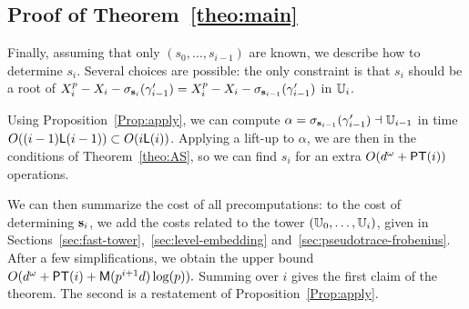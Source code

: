 
\subsection[Proof of the theorem]{Proof of Theorem~\ref{theo:main}}

Finally, assuming that only $(s_0,\dots,s_{i-1})$ are known, we
describe how to determine $s_i$. Several choices are possible: the
only constraint is that $s_i$ should be a root of
$X_i^p-X_i-\sigma_{\mathbf{s}_i}(\gamma'_{i-1})=X_i^p-X_i-\sigma_{\mathbf{s}_{i-1}}(\gamma'_{i-1})$
in $\mathbb{U}_i$.

Using Proposition~\ref{Prop:apply}, we can compute
$\alpha=\sigma_{\mathbf{s}_{i-1}}(\gamma'_{i-1}) \dashv\mathbb{U}_{i-1}$ in time
$O((i-1)\mathsf{L}(i-1)) \subset O(i\mathsf{L}(i))$.  Applying a lift-up to $\alpha$,
we are then in the conditions of Theorem~\ref{theo:AS}, so we can find
$s_i$ for an extra $O(d^\omega + \mathsf{PT}(i))$ operations.

We can then summarize the cost of all precomputations: to the cost of
determining $\mathbf{s}_i$, we add the costs related to the tower
$(\mathbb{U}_0,\dots,\mathbb{U}_i)$, given in
Sections~\ref{sec:fast-tower},~\ref{sec:level-embedding}
and~\ref{sec:pseudotrace-frobenius}. After a few simplifications, we
obtain the upper bound $O( d^\omega + \mathsf{PT}(i) + \mathsf{M}(p^{i+1} d)
\log(p)).$ Summing over $i$ gives the first claim of the theorem. The
second is a restatement of Proposition~\ref{Prop:apply}.


%
